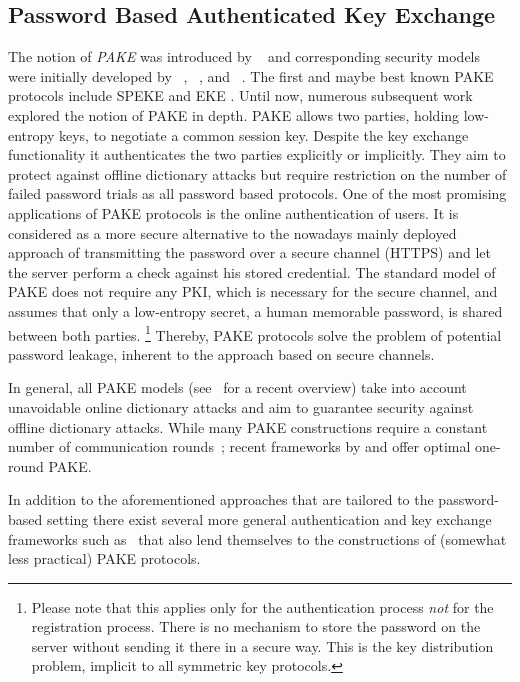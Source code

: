 \subsection{Password Based Authenticated Key Exchange}
The notion of \emph{\ac{PAKE}} was introduced by \citeauthor{bellovin92}~\cite{bellovin92} and corresponding security models were initially developed by \citeauthor{Bellare2000}~\cite{Bellare2000}, \citeauthor{Boyko2000}~\cite{Boyko2000}, and \citeauthor{Goldreich01}~\cite{Goldreich01}.
The first and maybe best known \ac{PAKE} protocols include SPEKE \cite{Jablon96} and EKE \cite{bellovin92,Bellare2000}.
Until now, numerous subsequent work explored the notion of \acl{PAKE} in depth.
\ac{PAKE} allows two parties, holding low-entropy keys, to negotiate a common session key.
Despite the key exchange functionality it authenticates the two parties explicitly or implicitly.
They aim to protect against offline dictionary attacks but require restriction on the number of failed password trials as all password based protocols.
One of the most promising applications of \ac{PAKE} protocols is the online authentication of users.
It is considered as a more secure alternative to the nowadays mainly deployed approach of transmitting the password over a secure channel (\ac{HTTPS}) and let the server perform a check against his stored credential.
The standard model of \ac{PAKE} does not require any \ac{PKI}, which is necessary for the secure channel, and assumes that only a low-entropy secret, \ie a human memorable password, is shared between both parties.
\footnote{Please note that this applies only for the authentication process \emph{not} for the registration process.
There is no mechanism to store the password on the server without sending it there in a secure way.
This is the key distribution problem, implicit to all symmetric key protocols.}
Thereby, \ac{PAKE} protocols solve the problem of potential password leakage, inherent to the approach based on secure channels.

In general, all PAKE models (see~\cite{Pointcheval2012} for a recent overview) take into account unavoidable online dictionary attacks and aim to guarantee security against offline dictionary attacks.
While many PAKE constructions require a constant number of communication rounds~\cite{KatzOY01,Gennaro2003,Abdalla2005,Gennaro2008,Katz2009a,Katz2011}; recent frameworks by \citeauthor{Katz2011} \cite{Katz2011} and \citeauthor{Benhamouda2013} \cite{Benhamouda2013} offer optimal one-round PAKE.

In addition to the aforementioned approaches that are tailored to the password-based setting there exist several more general authentication and key exchange frameworks such as~\cite{Camenisch2010,Blazy2012} that also lend themselves to the constructions of (somewhat less practical) PAKE protocols.

